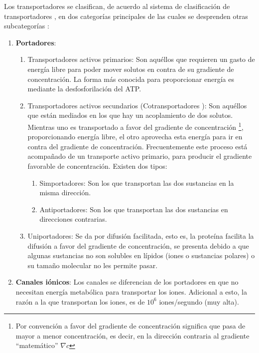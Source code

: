 Los transportadores se clasifican, de acuerdo al sistema de clasificaci\'{o}n de transportadores \cite{Nelson2011}, en dos categor\'{i}as principales de las cuales se desprenden otras subcategor\'{i}as :
\begin{enumerate}
 \item \textbf{Portadores}:
 \begin{enumerate}
 \item[1.] Transportadores activos primarios: Son aqu\'{e}llos que requieren un gasto de energ\'{i}a libre para poder mover solutos en contra de su gradiente de concentraci\'{o}n. La forma m\'{a}s conocida para proporcionar energ\'{i}a es mediante la desfosforilaci\'{o}n del ATP.
 \item[2.a] Transportadores activos secundarios (Cotransportadores \cite{Nelson2011}): Son aqu\'{e}llos que est\'{a}n mediados en los que hay un acoplamiento de dos solutos. Mientras uno es transportado a favor del gradiente de concentraci\'{o}n \footnote{Por convenci\'{o}n a favor del gradiente de concentraci\'{o}n significa que pasa de mayor a menor concentraci\'{o}n, es decir, en la direcci\'{o}n contraria al gradiente ``matem\'{a}tico'' $\nabla c$}, proporcionando energ\'{i}a libre, el otro aprovecha esta energ\'{i}a para ir en contra del gradiente de concentraci\'{o}n. Frecuentemente este proceso est\'{a} acompa\~{n}ado de un transporte activo primario, para producir el gradiente favorable de concentraci\'{o}n. Existen dos tipos:
  \begin{enumerate}
 \item[a)] Simportadores: Son los que transportan las dos sustancias en la misma direcci\'{o}n.
 \item[b)] Antiportadores: Son los que transportan las dos sustancias en direcciones contrarias.
 \end{enumerate}
 \item[2.b] Uniportadores: Se da por difusi\'{o}n facilitada, esto es, la prote\'{i}na facilita la difusi\'{o}n a favor del gradiente de concentraci\'{o}n, se presenta debido a que algunas sustancias no son solubles en l\'{i}pidos (iones o sustancias polares) o su tama\~{n}o molecular no les permite pasar.
 \end{enumerate}
 \item  \textbf{Canales i\'{o}nicos}: Los canales se diferencian de los portadores en que no necesitan energ\'{i}a metab\'{o}lica para transportar los iones. Adicional a esto, la raz\'{o}n a la que transportan los iones, es de $10^6$ iones/segundo  (muy alta).
 \end{enumerate}


